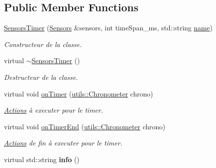 \subsection*{Public Member Functions}
\begin{DoxyCompactItemize}
\item 
\hyperlink{classSensorsTimer_a05cd5d0cb15090e02143b6fc4e715f01}{Sensors\+Timer} (\hyperlink{classSensors}{Sensors} \&sensors, int time\+Span\+\_\+ms, std\+::string \hyperlink{classITimerPosixListener_a56abc90e01e315320b855399b2c0096e}{name})
\begin{DoxyCompactList}\small\item\em Constructeur de la classe. \end{DoxyCompactList}\item 
\mbox{\label{classSensorsTimer_a303c947caefada50f2dffa919e81efb9}} 
virtual \hyperlink{classSensorsTimer_a303c947caefada50f2dffa919e81efb9}{$\sim$\+Sensors\+Timer} ()
\begin{DoxyCompactList}\small\item\em Destructeur de la classe. \end{DoxyCompactList}\item 
\mbox{\label{classSensorsTimer_abc377178c2471f664b31658554963e83}} 
virtual void \hyperlink{classSensorsTimer_abc377178c2471f664b31658554963e83}{on\+Timer} (\hyperlink{classutils_1_1Chronometer}{utils\+::\+Chronometer} chrono)
\begin{DoxyCompactList}\small\item\em \hyperlink{classActions}{Actions} à executer pour le timer. \end{DoxyCompactList}\item 
\mbox{\label{classSensorsTimer_a7ec418109fad3a911508b37df9b4cfb8}} 
virtual void \hyperlink{classSensorsTimer_a7ec418109fad3a911508b37df9b4cfb8}{on\+Timer\+End} (\hyperlink{classutils_1_1Chronometer}{utils\+::\+Chronometer} chrono)
\begin{DoxyCompactList}\small\item\em \hyperlink{classActions}{Actions} de fin à executer pour le timer. \end{DoxyCompactList}\item 
\mbox{\label{classSensorsTimer_a209ba3c781ee821deb2ac082cb98e297}} 
virtual std\+::string {\bfseries info} ()
\end{DoxyCompactItemize}
